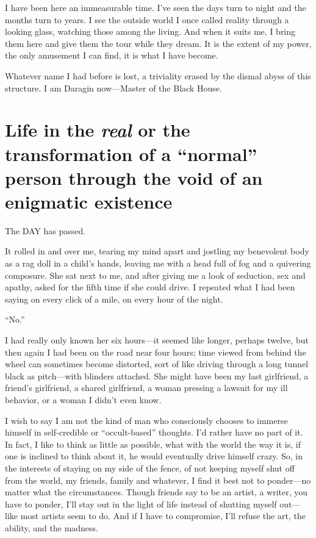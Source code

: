 I have been here an immeasurable time. I've seen the days turn to night
and the months turn to years. I see the outside world I once called
reality through a looking glass, watching those among the living. And
when it suits me, I bring them here and give them the tour while they
dream. It is the extent of my power, the only amusement I can find, it
is what I have become.

Whatever name I had before is lost, a triviality erased by the dismal
abyss of this structure. I am Daragin now---Master of the Black House.

\section{\texorpdfstring{Life in the \emph{real} or the transformation
of a ``normal'' person through the void of an enigmatic
existence}{Life in the real or the transformation of a ``normal'' person through the void of an enigmatic existence}}\label{life-in-the-real-or-the-transformation-of-a-normal-person-through-the-void-of-an-enigmatic-existence}

The DAY has passed.

It rolled in and over me, tearing my mind apart and jostling my
benevolent body as a rag doll in a child's hands, leaving me with a head
full of fog and a quivering composure. She sat next to me, and after
giving me a look of seduction, sex and apathy, asked for the fifth time
if she could drive. I repeated what I had been saying on every click of
a mile, on every hour of the night.

``No.''

I had really only known her six hours---it seemed like longer, perhaps
twelve, but then again I had been on the road near four hours; time
viewed from behind the wheel can sometimes become distorted, sort of
like driving through a long tunnel black as pitch---with blinders
attached. She might have been my last girlfriend, a friend's girlfriend,
a shared girlfriend, a woman pressing a lawsuit for my ill behavior, or
a woman I didn't even know.

I wish to say I am not the kind of man who consciously chooses to
immerse himself in self-credible or ``occult-based'' thoughts. I'd
rather have no part of it. In fact, I like to think as little as
possible, what with the world the way it is, if one is inclined to think
about it, he would eventually drive himself crazy. So, in the interests
of staying on my side of the fence, of not keeping myself shut off from
the world, my friends, family and whatever, I find it best not to
ponder---no matter what the circumstances. Though friends say to be an
artist, a writer, you have to ponder, I'll stay out in the light of life
instead of shutting myself out---like most artists seem to do. And if I
have to compromise, I'll refuse the art, the ability, and the madness.

